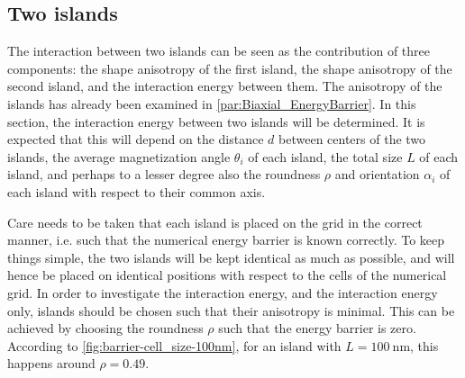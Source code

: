 \documentclass[11pt,a4paper,english]{article}
\begin{document}
\subsection{Two islands}
The interaction between two islands can be seen as the contribution of three components: the shape anisotropy of the first island, the shape anisotropy of the second island, and the interaction energy between them. The anisotropy of the islands has already been examined in \cref{par:Biaxial_EnergyBarrier}. In this section, the interaction energy between two islands will be determined. It is expected that this will depend on the distance $d$ between centers of the two islands, the average magnetization angle $\theta_i$ of each island, the total size $L$ of each island, and perhaps to a lesser degree also the roundness $\rho$ and orientation $\alpha_i$ of each island with respect to their common axis. \par
Care needs to be taken that each island is placed on the grid in the correct manner, i.e. such that the numerical energy barrier is known correctly. To keep things simple, the two islands will be kept identical as much as possible, and will hence be placed on identical positions with respect to the cells of the numerical grid. %
In order to investigate the interaction energy, and the interaction energy only, islands should be chosen such that their anisotropy is minimal. This can be achieved by choosing the roundness $\rho$ such that the energy barrier is zero. According to \cref{fig:barrier-cell_size-100nm}, for an island with $L=\SI{100}{\nano\metre}$, this happens around $\rho=0.49$.
\end{document}
